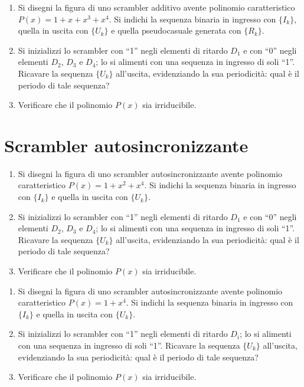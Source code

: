         \begin{enumerate}
            \item Si disegni la figura di uno scrambler additivo avente polinomio caratteristico $P(x)= 1+x +x^3 +x^4$. 
                Si indichi la sequenza binaria in ingresso con $\{I_k\}$, quella in uscita con $\{U_k\}$ e quella 
                pseudo\nbdash casuale generata con $\{R_k\}$.
            \item Si inizializzi lo scrambler con  ``1'' negli elementi di ritardo $D_1$ e con ``0'' negli elementi 
                $D_2$, $D_3$ e $D_4$; lo si alimenti con una sequenza in ingresso di soli ``1''. Ricavare la 
                sequenza $\{U_k\}$ all'uscita, evidenziando la sua periodicità: qual è il periodo di tale sequenza?
            \item Verificare che il polinomio $P(x)$ sia irriducibile.
        \end{enumerate}

    \bigskip
    \section{Scrambler autosincronizzante}
        \begin{enumerate}
            \item Si disegni la figura di uno scrambler autosincronizzante avente polinomio caratteristico 
                $P(x)= 1 +x^2 +x^4$. Si indichi la sequenza binaria in ingresso con $\{I_k\}$ e quella in 
                uscita con $\{U_k\}$.
            \item Si inizializzi lo scrambler con  ``1'' negli elementi di ritardo $D_1$ e con ``0'' negli elementi 
                $D_2$, $D_3$ e $D_4$; lo si alimenti con una sequenza in ingresso di soli ``1''. Ricavare la 
                sequenza $\{U_k\}$ all'uscita, evidenziando la sua periodicità: qual è il periodo di tale sequenza?
            \item Verificare che il polinomio $P(x)$ sia irriducibile.
        \end{enumerate}

        \begin{enumerate}
            \item Si disegni la figura di uno scrambler autosincronizzante avente polinomio caratteristico 
                $P(x)= 1 +x^4$. Si indichi la sequenza binaria in ingresso con $\{I_k\}$ e quella in 
                uscita con $\{U_k\}$.
            \item Si inizializzi lo scrambler con  ``1'' negli elementi di ritardo $D_i$; lo si alimenti con una 
                sequenza in ingresso di soli ``1''. Ricavare la sequenza $\{U_k\}$ all'uscita, evidenziando la sua 
                periodicità: qual è il periodo di tale sequenza?
            \item Verificare che il polinomio $P(x)$ sia irriducibile.
        \end{enumerate}

